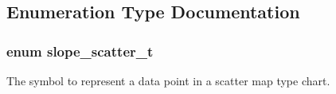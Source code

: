 \subsection{Enumeration Type Documentation}
\hypertarget{group__Item_ga7be66725a3a198bcbd9434e6d3ad70c5}{
\subsubsection[{slope\+\_\+scatter\+\_\+t}]{\setlength{\rightskip}{0pt plus 5cm}enum {\bf slope\+\_\+scatter\+\_\+t}}}\label{group__Item_ga7be66725a3a198bcbd9434e6d3ad70c5}


The symbol to represent a data point in a scatter map type chart. 

